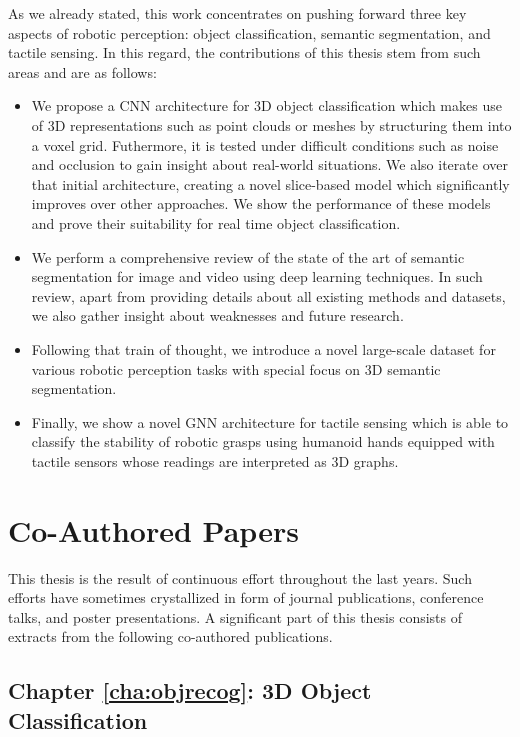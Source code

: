 As we already stated, this work concentrates on pushing forward three key aspects of robotic perception: object classification, semantic segmentation, and tactile sensing. In this regard, the contributions of this thesis stem from such areas and are as follows:

\begin{itemize}
    \item We propose a \acl{CNN} architecture for \acs{3D} object classification which makes use of \acs{3D} representations such as point clouds or meshes by structuring them into a voxel grid. Futhermore, it is tested under difficult conditions such as noise and occlusion to gain insight about real-world situations. We also iterate over that initial architecture, creating a novel slice-based model which significantly improves over other approaches. We show the performance of these models and prove their suitability for real time object classification.
    \item We perform a comprehensive review of the state of the art of semantic segmentation for image and video using deep learning techniques. In such review, apart from providing details about all existing methods and datasets, we also gather insight about weaknesses and future research.
    \item Following that train of thought, we introduce a novel large-scale dataset for various robotic perception tasks with special focus on 3D semantic segmentation.
    \item Finally, we show a novel \acl{GNN} architecture for tactile sensing which is able to classify the stability of robotic grasps using humanoid hands equipped with tactile sensors whose readings are interpreted as \acs{3D} graphs.
\end{itemize}

\section{Co-Authored Papers}
\label{cha:introduction:sec:papers}

This thesis is the result of continuous effort throughout the last years. Such efforts have sometimes crystallized in form of journal publications, conference talks, and poster presentations. A significant part of this thesis consists of extracts from the following co-authored publications.

\subsection{Chapter \ref{cha:objrecog}: 3D Object Classification}

